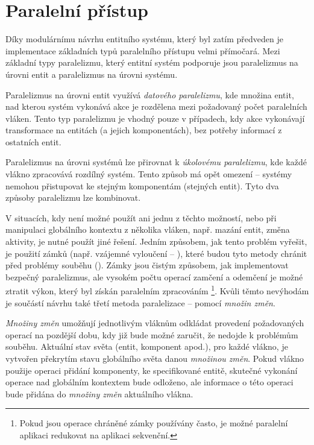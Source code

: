 \section{Paralelní přístup}

Díky modulárnímu návrhu entitního systému, který byl zatím předveden je implementace základních typů paralelního přístupu velmi přímočará. Mezi základní typy paralelizmu, který entitní systém podporuje jsou paralelizmus na úrovni entit a paralelizmus na úrovni systému.

Paralelizmus na úrovni entit využívá \emph{datového paralelizmu}, kde množina entit, nad kterou systém vykonává akce je rozdělena mezi požadovaný počet paralelních vláken. Tento typ paralelizmu je vhodný pouze v případech, kdy akce vykonávají transformace na entitách (a jejich komponentách), bez potřeby informací z ostatních entit. 

Paralelizmus na úrovni systémů lze přirovnat k \emph{úkolovému paralelizmu}, kde každé vlákno zpracovává rozdílný systém. Tento způsob má opět omezení -- systémy nemohou přistupovat ke stejným komponentám (stejných entit). Tyto dva způsoby paralelizmu lze kombinovat.

V situacích, kdy není možné použít ani jednu z těchto možností, nebo při manipulaci globálního kontextu z několika vláken, např. mazání entit, změna aktivity, je nutné použít jiné řešení. Jedním způsobem, jak tento problém vyřešit, je použití zámků (např. vzájemné vyloučení -- ), které budou tyto metody chránit před problémy souběhu (). Zámky jsou čistým způsobem, jak implementovat bezpečný paralelizmus, ale vysokém počtu operací zamčení a odemčení je možné ztratit výkon, který byl získán paralelním zpracováním \footnote{Pokud jsou operace chráněné zámky používány často, je možné paralelní aplikaci redukovat na aplikaci sekvenční.}. Kvůli těmto nevýhodám je součástí návrhu také třetí metoda paralelizace -- pomocí \emph{množin změn}.

\emph{Množiny změn} umožňují jednotlivým vláknům odkládat provedení požadovaných operací na pozdější dobu, kdy již bude možné zaručit, že nedojde k problémům souběhu. Aktuální stav světa (entit, komponent apod.), pro každé vlákno, je vytvořen překrytím stavu globálního světa danou \emph{množinou změn}. Pokud vlákno použije operaci přidání komponenty, ke specifikované entitě, skutečné vykonání operace nad globálním kontextem bude odloženo, ale informace o této operaci bude přidána do \emph{množiny změn} aktuálního vlákna.

